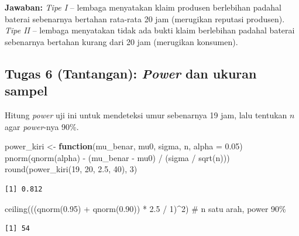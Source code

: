 \documentclass[
  indonesian,
  letterpaper,
]{book}
\newenvironment{Shaded}{\begin{snugshade}}{\end{snugshade}}
\newcommand{\AttributeTok}[1]{\textcolor[rgb]{0.40,0.45,0.13}{#1}}
\newcommand{\CommentTok}[1]{\textcolor[rgb]{0.37,0.37,0.37}{#1}}
\newcommand{\ControlFlowTok}[1]{\textcolor[rgb]{0.00,0.23,0.31}{\textbf{#1}}}
\newcommand{\DecValTok}[1]{\textcolor[rgb]{0.68,0.00,0.00}{#1}}
\newcommand{\FloatTok}[1]{\textcolor[rgb]{0.68,0.00,0.00}{#1}}
\newcommand{\FunctionTok}[1]{\textcolor[rgb]{0.28,0.35,0.67}{#1}}
\newcommand{\NormalTok}[1]{\textcolor[rgb]{0.00,0.23,0.31}{#1}}
\newcommand{\OtherTok}[1]{\textcolor[rgb]{0.00,0.23,0.31}{#1}}
\newcommand{\SpecialCharTok}[1]{\textcolor[rgb]{0.37,0.37,0.37}{#1}}
\begin{document}
\textbf{Jawaban:} \emph{Tipe I} -- lembaga menyatakan klaim produsen
berlebihan padahal baterai sebenarnya bertahan rata-rata 20 jam
(merugikan reputasi produsen). \emph{Tipe II} -- lembaga menyatakan
tidak ada bukti klaim berlebihan padahal baterai sebenarnya bertahan
kurang dari 20 jam (merugikan konsumen).

\subsection{\texorpdfstring{Tugas 6 (Tantangan): \emph{Power} dan ukuran
sampel}{Tugas 6 (Tantangan): Power dan ukuran sampel}}\label{tugas-6-tantangan-power-dan-ukuran-sampel}

Hitung \emph{power} uji ini untuk mendeteksi umur sebenarnya 19 jam,
lalu tentukan \(n\) agar \emph{power}-nya 90\%.

\begin{Shaded}
\begin{Highlighting}[]
\NormalTok{power\_kiri }\OtherTok{\textless{}{-}} \ControlFlowTok{function}\NormalTok{(mu\_benar, mu0, sigma, n, }\AttributeTok{alpha =} \FloatTok{0.05}\NormalTok{)}
  \FunctionTok{pnorm}\NormalTok{(}\FunctionTok{qnorm}\NormalTok{(alpha) }\SpecialCharTok{{-}}\NormalTok{ (mu\_benar }\SpecialCharTok{{-}}\NormalTok{ mu0) }\SpecialCharTok{/}\NormalTok{ (sigma }\SpecialCharTok{/} \FunctionTok{sqrt}\NormalTok{(n)))}
\FunctionTok{round}\NormalTok{(}\FunctionTok{power\_kiri}\NormalTok{(}\DecValTok{19}\NormalTok{, }\DecValTok{20}\NormalTok{, }\FloatTok{2.5}\NormalTok{, }\DecValTok{40}\NormalTok{), }\DecValTok{3}\NormalTok{)}
\end{Highlighting}
\end{Shaded}

\begin{verbatim}
[1] 0.812
\end{verbatim}

\begin{Shaded}
\begin{Highlighting}[]
\FunctionTok{ceiling}\NormalTok{(((}\FunctionTok{qnorm}\NormalTok{(}\FloatTok{0.95}\NormalTok{) }\SpecialCharTok{+} \FunctionTok{qnorm}\NormalTok{(}\FloatTok{0.90}\NormalTok{)) }\SpecialCharTok{*} \FloatTok{2.5} \SpecialCharTok{/} \DecValTok{1}\NormalTok{)}\SpecialCharTok{\^{}}\DecValTok{2}\NormalTok{)   }\CommentTok{\# n satu arah, power 90\%}
\end{Highlighting}
\end{Shaded}

\begin{verbatim}
[1] 54
\end{verbatim}
\end{document}
